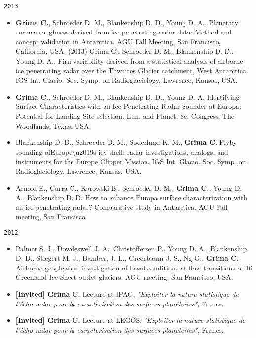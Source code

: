 \noindent\texttt{2013}

\begin{itemize}
\item
  \textbf{Grima C.}, Schroeder D. M., Blankenship D. D., Young D. A..
  Planetary surface roughness derived from ice penetrating radar data:
  Method and concept validation in Antarctica. AGU Fall Meeting, San
  Francisco, California, USA. (2013) Grima C., Schroeder D. M.,
  Blankenship D. D., Young D. A.. Firn variability derived from a
  statistical analysis of airborne ice penetrating radar over the
  Thwaites Glacier catchment, West Antarctica. IGS Int. Glacio. Soc.
  Symp. on Radioglaciology, Lawrence, Kansas, USA.
\item
  \textbf{Grima C.}, Schroeder D. M., Blankenship D. D., Young D. A.
  Identifying Surface Characteristics with an Ice Penetrating Radar
  Sounder at Europa: Potential for Landing Site selection. Lun. and
  Planet. Sc. Congress, The Woodlands, Texas, USA.
\item
  Blankenship D. D., Schroeder D. M., Soderlund K. M., \textbf{Grima C.}
  Flyby sounding ofEurope\textbackslash{}u2019s icy shell: radar
  investigations, analogs, and instruments for the Europe Clipper
  Mission. IGS Int. Glacio. Soc. Symp. on Radioglaciology, Lawrence,
  Kansas, USA.
\item
  Arnold E., Curra C., Karowski B., Schroeder D. M., \textbf{Grima C.},
  Young D. A., Blankenship D. D. How to enhance Europa surface
  characterization with an ice penetrating radar? Comparative study in
  Antarctica. AGU Fall meeting, San Francisco.
\end{itemize}

\noindent\texttt{2012}

\begin{itemize}
\item
  Palmer S. J., Dowdeswell J. A., Christoffersen P., Young D. A.,
  Blankenship D. D., Stiegert M. J., Bamber, J. L., Greenbaum J. S., Ng
  G., \textbf{Grima C.} Airborne geophysical investigation of basal
  conditions at flow transitions of 16 Greenland Ice Sheet outlet
  glaciers. AGU meeting, San Francisco, USA.
\item
  \textbf{{[}Invited{]} Grima C.} Lecture at IPAG, \emph{"Exploiter la
  nature statistique de l'écho radar pour la caractérisation des
  surfaces planétaires"}, France.
\item
  \textbf{{[}Invited{]} Grima C.} Lecture at LEGOS, \emph{"Exploiter la
  nature statistique de l'écho radar pour la caractérisation des
  surfaces planétaires"}, France.
\end{itemize}

